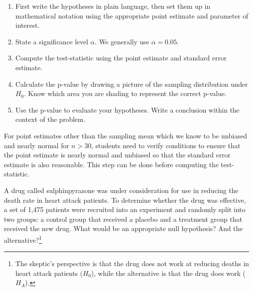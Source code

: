 \begin{termBox}{
\begin{enumerate}
\setlength{\itemsep}{0mm}
\item First write the hypotheses in plain language, then set them up in mathematical notation using the appropriate point estimate and parameter of interest. 
\item State a significance level $\alpha$. We generally use $\alpha=0.05$. 
\item Compute the test-statistic using the point estimate and standard error estimate. 
\item Calculate the p-value by drawing a picture of the sampling distribution under $H_0$. Know which area you are shading to represent the correct p-value. 
\item Use the p-value to evaluate your hypotheses. Write a conclusion within the context of the problem. 
\end{enumerate}
} For point estimates other than the sampling mean which we know to be unbiased and nearly normal for $n>30$, students need to verify conditions to ensure that the point estimate is nearly normal and unbiased so that the standard error estimate is also reasonable. This step can be done before computing the test-statistic.  
\end{termBox}

\begin{exercise} \label{fdaHypSetupForSulph}
A drug called sulphinpyrazone was under consideration for use in reducing the death rate in heart attack patients. To determine whether the drug was effective, a set of 1,475 patients were recruited into an experiment and randomly split into two groups: a control group that received a placebo and a treatment group that received the new drug. What would be an appropriate null hypothesis? And the alternative?\footnote{The skeptic's perspective is that the drug does not work at reducing deaths in heart attack patients ($H_0$), while the alternative is that the drug does work ($H_A$).}
\end{exercise}

